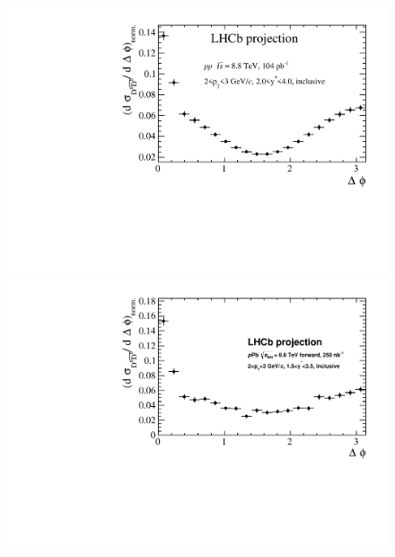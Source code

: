 \begin{figure}
\centering
\includegraphics{hf/figures/Deltaphi_pp_inclusive.pdf}
\includegraphics{hf/figures/Deltaphi_pPb_inclusive.pdf}
\caption{ %
}
\label{fig:DD}
\end {figure}


